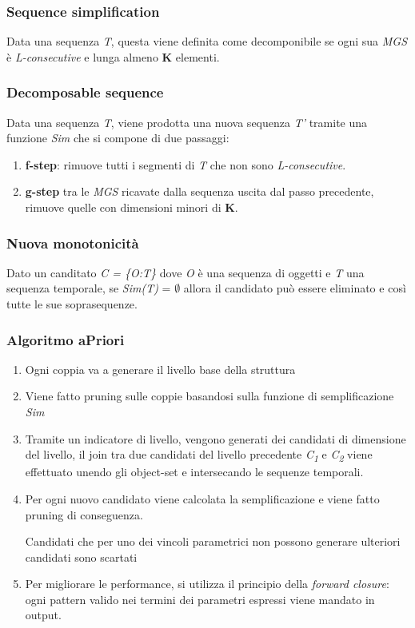 \documentclass{beamer}
\begin{document}
\begin{frame}
	\frametitle{Sequence simplification }
	Data una sequenza \textit{T}, questa viene definita come decomponibile se ogni sua \textit{MGS} è \textit{L-consecutive} e lunga almeno \textbf{K} elementi.
\end{frame}

\begin{frame}
	\frametitle{Decomposable sequence}
	Data una sequenza \textit{T}, viene prodotta una nuova sequenza \textit{T'} tramite una funzione \textit{Sim} che si compone di due passaggi: 
	\begin{enumerate}
		\item \textbf{f-step}: rimuove tutti i segmenti di \textit{T} che non sono \textit{L-consecutive}.
		\item \textbf{g-step} tra le \textit{MGS} ricavate dalla sequenza uscita dal passo precedente, rimuove quelle con dimensioni minori di \textbf{K}.
	\end{enumerate}
\end{frame}

\begin{frame}
	\frametitle{Nuova monotonicità}
   Dato un canditato \textit{C = \{O:T\}} dove \textit{O} è una sequenza di oggetti e \textit{T} una sequenza temporale, se \textit{Sim(T)} = $\emptyset$ allora il candidato può essere eliminato e così tutte le sue soprasequenze.
\end{frame}

\begin{frame}
	\frametitle{Algoritmo aPriori}
	\begin{enumerate}
		\item Ogni coppia va a generare il livello base della struttura
		\item Viene fatto pruning sulle coppie basandosi sulla funzione di semplificazione \textit{Sim}
		\item Tramite un indicatore di livello, vengono generati dei candidati di dimensione del livello, il join tra due candidati del livello precedente \textit{C\textsubscript{1}} e
		 \textit{C\textsubscript{2}} viene effettuato unendo gli object-set e intersecando le sequenze temporali.
		 \item Per ogni nuovo candidato viene calcolata la semplificazione e viene fatto pruning di conseguenza.
		 
		 Candidati che per uno dei vincoli parametrici non possono generare ulteriori candidati sono scartati
		 
		 \item Per migliorare le performance, si utilizza il principio della \textit{forward closure}: ogni pattern valido nei termini dei parametri espressi viene mandato in output.
	\end{enumerate}
\end{frame}
\end{document}
